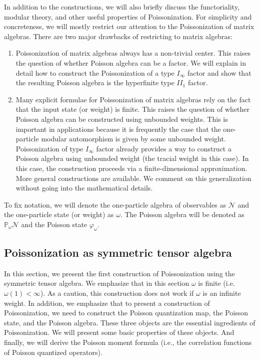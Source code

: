 \documentclass[a4paper,11pt]{article}
\theoremstyle{definition}
\numberwithin{equation}{section}
\begin{document}
In addition to the constructions, we will also briefly discuss the functoriality, modular theory, and other useful properties of Poissonization. For simplicity and concreteness, we will mostly restrict our attention to the Poissonization of matrix algebras. There are two major drawbacks of restricting to matrix algebras:
\begin{enumerate}
    \item Poissonization of matrix algebras always has a non-trivial center. This raises the question of whether Poisson algebra can be a factor. We will explain in detail how to construct the Poissonization of a type $I_\infty$ factor and show that the resulting Poisson algebra is the hyperfinite type $II_1$ factor.
    \item Many explicit formulae for Poissonization of matrix algebras rely on the fact that the input state (or weight) is finite. This raises the question of whether Poisson algebra can be constructed using unbounded weights. This is important in applications because it is frequently the case that the one-particle modular automorphism is given by some unbounded weight. Poissonization of type $I_\infty$ factor already provides a way to construct a Poisson algebra using unbounded weight (the tracial weight in this case). In this case, the construction proceeds via a finite-dimensional approximation. More general constructions are available. We comment on this generalization without going into the mathematical details. 
\end{enumerate}
To fix notation, we will denote the one-particle algebra of observables as $\mathcal{N}$ and the one-particle state (or weight) as $\omega$. The Poisson algebra will be denoted as $\mathbb{P}_\omega\mathcal{N}$ and the Poisson state $\varphi_\omega$.

\subsection{Poissonization as symmetric tensor algebra}

In this section, we present the first construction of Poissonization using the symmetric tensor algebra. We emphasize that in this section $\omega$ is finite (i.e. $\omega(1) < \infty$). As a caution, this construction does not work if $\omega$ is an infinite weight. In addition, we emphasize that to present a construction of Poissonization, we need to construct the Poisson quantization map, the Poisson state, and the Poisson algebra. These three objects are the essential ingredients of Poissonization. We will present some basic properties of these objects. And finally, we will derive the Poisson moment formula (i.e., the correlation functions of Poisson quantized operators).
\end{document}
